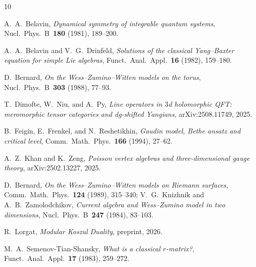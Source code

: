 \documentclass[11pt]{article}
\theoremstyle{plain}
\theoremstyle{definition}
\theoremstyle{remark}
\numberwithin{equation}{section}
\begin{document}
\begin{thebibliography}{10}

A.~A.~Belavin,
\emph{Dynamical symmetry of integrable quantum systems},
Nucl.\ Phys.\ B~\textbf{180} (1981), 189--200.

A.~A.~Belavin and V.~G.~Drinfeld,
\emph{Solutions of the classical Yang--Baxter equation for simple Lie
algebras},
Funct.\ Anal.\ Appl.\ \textbf{16} (1982), 159--180.

D.~Bernard,
\emph{On the Wess--Zumino--Witten models on the torus},
Nucl.\ Phys.\ B~\textbf{303} (1988), 77--93.

T.~Dimofte, W.~Niu, and A.~Py,
\emph{Line operators in $3$d holomorphic QFT: meromorphic tensor
categories and dg-shifted Yangians},
arXiv:2508.11749, 2025.

B.~Feigin, E.~Frenkel, and N.~Reshetikhin,
\emph{Gaudin model, Bethe ansatz and critical level},
Comm.\ Math.\ Phys.\ \textbf{166} (1994), 27--62.

A.~Z.~Khan and K.~Zeng,
\emph{Poisson vertex algebras and three-dimensional gauge theory},
arXiv:2502.13227, 2025.

D.~Bernard,
\emph{On the Wess--Zumino--Witten models on Riemann surfaces},
Comm.\ Math.\ Phys.\ \textbf{124} (1989), 315--340;
V.~G.~Knizhnik and A.~B.~Zamolodchikov,
\emph{Current algebra and Wess--Zumino model in two dimensions},
Nucl.\ Phys.\ B~\textbf{247} (1984), 83--103.

R.~Lorgat,
\emph{Modular Koszul Duality},
preprint, 2026.

M.~A.~Semenov-Tian-Shansky,
\emph{What is a classical $r$-matrix?},
Funct.\ Anal.\ Appl.\ \textbf{17} (1983), 259--272.

\end{thebibliography}
\end{document}
